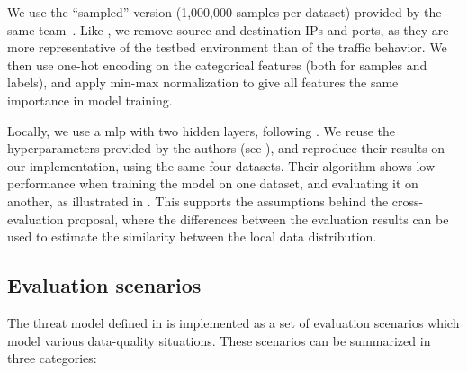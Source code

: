 We use the ``sampled'' version (1,000,000 samples per dataset) provided by the same team~\cite{layeghy_GeneralisabilityMachineLearningbased_2022}. 
Like \textcite{decarvalhobertoli_Generalizingintrusiondetection_2023}, we remove source and destination IPs and ports, as they are more representative of the testbed environment than of the traffic behavior.
We then use one-hot encoding on the categorical features (both for samples and labels), and apply min-max normalization to give all features the same importance in model training.

Locally, we use a \gls{mlp} with two hidden layers, following \textcite{popoola_FederatedDeepLearning_2021}.
We reuse the hyperparameters provided by the authors (see ), and reproduce their results on our implementation, using the same four datasets.
Their algorithm shows low performance when training the model on one dataset, and evaluating it on another, as illustrated in .
This supports the assumptions behind the cross-evaluation proposal, where the differences between the evaluation results can be used to estimate the similarity between the local data distribution.


\subsection{Evaluation scenarios\label{sec:radar.eval.methodo.scenarios}}

The threat model defined in  is implemented as a set of evaluation scenarios which model various data-quality situations.
These scenarios can be summarized in three categories:


